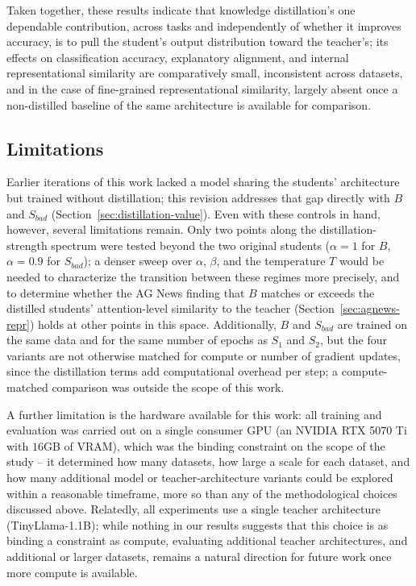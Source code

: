 \documentclass[conference]{IEEEtran}
\begin{document}
Taken together, these results indicate that knowledge distillation's one dependable contribution, across tasks and independently of whether it improves accuracy, is to pull the student's output distribution toward the teacher's; its effects on classification accuracy, explanatory alignment, and internal representational similarity are comparatively small, inconsistent across datasets, and in the case of fine-grained representational similarity, largely absent once a non-distilled baseline of the same architecture is available for comparison.

\subsection{Limitations}\label{sec:limitations}

Earlier iterations of this work lacked a model sharing the students' architecture but trained without distillation; this revision addresses that gap directly with $B$ and $S_{bad}$ (Section~\ref{sec:distillation-value}). Even with these controls in hand, however, several limitations remain. Only two points along the distillation-strength spectrum were tested beyond the two original students ($\alpha=1$ for $B$, $\alpha=0.9$ for $S_{bad}$); a denser sweep over $\alpha$, $\beta$, and the temperature $T$ would be needed to characterize the transition between these regimes more precisely, and to determine whether the AG News finding that $B$ matches or exceeds the distilled students' attention-level similarity to the teacher (Section~\ref{sec:agnews-repr}) holds at other points in this space. Additionally, $B$ and $S_{bad}$ are trained on the same data and for the same number of epochs as $S_1$ and $S_2$, but the four variants are not otherwise matched for compute or number of gradient updates, since the distillation terms add computational overhead per step; a compute-matched comparison was outside the scope of this work.

A further limitation is the hardware available for this work: all training and evaluation was carried out on a single consumer GPU (an NVIDIA RTX 5070 Ti with $16$GB of VRAM), which was the binding constraint on the scope of the study -- it determined how many datasets, how large a scale for each dataset, and how many additional model or teacher-architecture variants could be explored within a reasonable timeframe, more so than any of the methodological choices discussed above. Relatedly, all experiments use a single teacher architecture (TinyLlama-1.1B); while nothing in our results suggests that this choice is as binding a constraint as compute, evaluating additional teacher architectures, and additional or larger datasets, remains a natural direction for future work once more compute is available.
\end{document}
